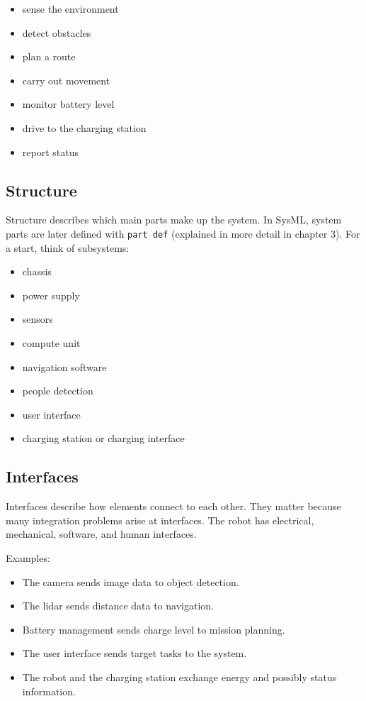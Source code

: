\begin{itemize}
    \item sense the environment
    \item detect obstacles
    \item plan a route
    \item carry out movement
    \item monitor battery level
    \item drive to the charging station
    \item report status
\end{itemize}

\subsection{Structure}
Structure describes which main parts make up the system. In SysML, system parts are later defined with \texttt{part def} (explained in more detail in chapter 3). For a start, think of subsystems:

\begin{itemize}
    \item chassis
    \item power supply
    \item sensors
    \item compute unit
    \item navigation software
    \item people detection
    \item user interface
    \item charging station or charging interface
\end{itemize}

\subsection{Interfaces}
Interfaces describe how elements connect to each other. They matter because many integration problems arise at interfaces. The robot has electrical, mechanical, software, and human interfaces.

Examples:

\begin{itemize}
    \item The camera sends image data to object detection.
    \item The lidar sends distance data to navigation.
    \item Battery management sends charge level to mission planning.
    \item The user interface sends target tasks to the system.
    \item The robot and the charging station exchange energy and possibly status information.
\end{itemize}

